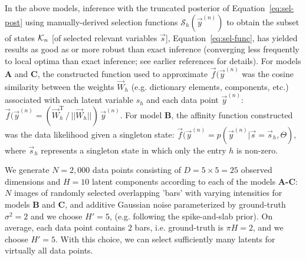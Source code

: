 In the above models, inference with the truncated posterior of Equation~\eqref{eq:sel-post} using manually-derived selection functions $\mathcal{S}_h(\vec{y}^{(n)})$ to obtain the subset of states $\mathcal{K}_{n}$ [of selected relevant variables $\vec{s}$], Equation~\eqref{eq:sel-func}, has yielded results as good as or more robust than exact inference (converging less frequently to local optima than exact inference; see earlier references for details).
For models \textbf{A} and \textbf{C}, the constructed function used to approximate $\vec{f}(\vec{y}^{(n)}$ was the cosine similarity between the weights $\vec{W}_h$ (e.g. dictionary elements, components, etc.) associated with each latent variable $s_h$ and 
each data point $\vec{y}^{(n)}$: 
$  \vec{f}(\vec{y}^{(n)} = (\vec{W}_{h}^{\mathrm{T}}\,/\,||\vec{W}_{h}||)\,\vec{y}^{(n)}$.
For model \textbf{B}, the affinity function constructed was the data likelihood given a singleton state:
 $\vec{f}(\vec{y}^{(n)} = p(\vec{y}^{(n)} | \vec{s}=\vec{s}_h, \Theta)$, 
%
where $\vec{s}_h$ represents a singleton state in which only the entry $h$ is non-zero.

We generate $N=2,000$ data points consisting of $D=5\times5=25$ observed dimensions and $H=10$ latent components according to each of the models \textbf{A-C}:
$N$ images of randomly selected overlapping 'bars' with varying intensities for models \textbf{B} and \textbf{C}, and additive Gaussian noise parameterized by ground-truth $\sigma^2 = 2$ and we choose $H' = 5$, (e.g. following the spike-and-slab prior). 
On average, each data point contains $2$ bars, i.e. ground-truth is $\pi H = 2$, and we choose $H'=5$. With this choice,
we can select sufficiently many latents for virtually all data points.


